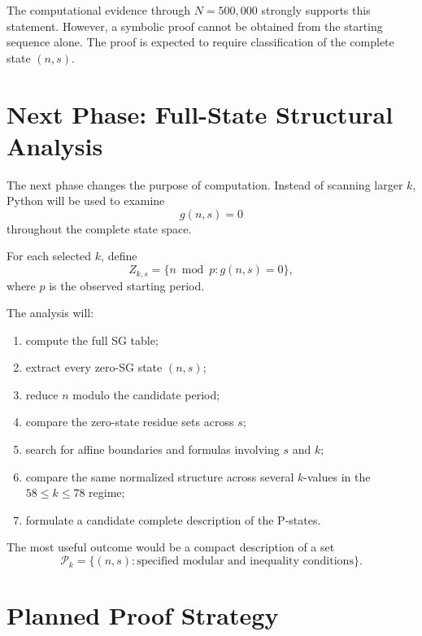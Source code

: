 \documentclass[11pt]{article}
\newcommand{\Ppos}{\mathcal{P}}
\begin{document}
The computational evidence through $N=500{,}000$ strongly supports this statement. However, a symbolic proof cannot be obtained from the starting sequence alone. The proof is expected to require classification of the complete state $(n,s)$.

\section{Next Phase: Full-State Structural Analysis}

The next phase changes the purpose of computation. Instead of scanning larger $k$, Python will be used to examine
\begin{equation}
    g(n,s)=0
\end{equation}
throughout the complete state space.

For each selected $k$, define
\begin{equation}
    Z_{k,s}=\{n\bmod p:g(n,s)=0\},
\end{equation}
where $p$ is the observed starting period.

The analysis will:
\begin{enumerate}
    \item compute the full SG table;
    \item extract every zero-SG state $(n,s)$;
    \item reduce $n$ modulo the candidate period;
    \item compare the zero-state residue sets across $s$;
    \item search for affine boundaries and formulas involving $s$ and $k$;
    \item compare the same normalized structure across several $k$-values in the $58\le k\le78$ regime;
    \item formulate a candidate complete description of the P-states.
\end{enumerate}

The most useful outcome would be a compact description of a set
\begin{equation}
    \Ppos_k=\{(n,s):\text{specified modular and inequality conditions}\}.
\end{equation}

\section{Planned Proof Strategy}
\end{document}
